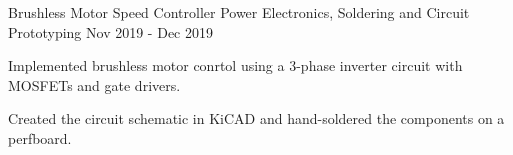 \begin{project}
  {Brushless Motor Speed Controller}
  {Power Electronics, Soldering and Circuit Prototyping}
  {Nov 2019 - Dec 2019}
  {}

  \item Implemented brushless motor conrtol using a 3-phase inverter circuit
        with MOSFETs and gate drivers.

  \item Created the circuit schematic in KiCAD and hand-soldered the
        components on a perfboard.

\end{project}
